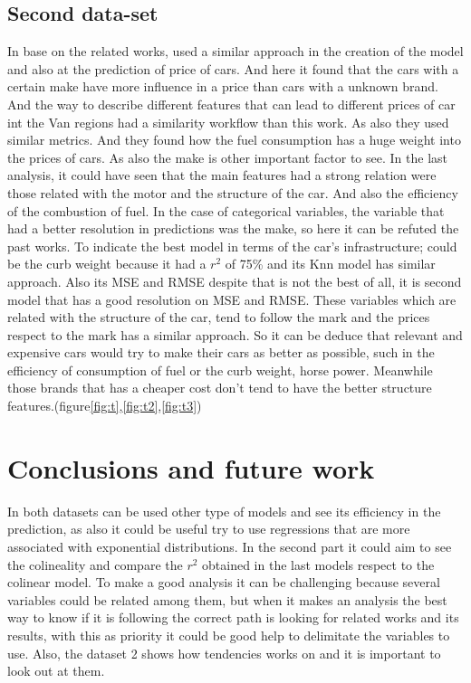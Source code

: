 \documentclass{article}
\begin{document}
\subsection{Second data-set}
In base on the related works, \citep{article_1012052} used a similar approach in the creation of the model and also at the prediction of price of cars. And here it found that the cars with a certain make have more influence in a price than cars with a unknown brand. And \citep{WOS:000927105100001} the way to describe different features that can lead to different prices of car int the Van regions had a similarity workflow than this work. As also they used similar metrics. And \citep{WEBER2019109} they found how the fuel consumption has a huge weight into the prices of cars. As also the make is other important factor to see.
In the last analysis, it could have seen that the main features had a strong relation were those related with the motor and the structure of the car. And also the efficiency of the combustion of fuel. In the case of categorical variables, the variable that had a better resolution in predictions was the make, so here it can be refuted the past works. To indicate the best model in terms of the car's infrastructure; could be the curb weight because it had a $r^2$ of 75\% and its Knn model has  similar approach. Also its MSE and RMSE despite that is not the best of all, it is second model that has a good resolution on MSE and RMSE. 
These variables which are related with the structure of the car, tend to follow the mark and the prices respect to the mark has a similar approach. So it can be deduce that relevant and expensive cars would try to make their cars as better as possible, such in the efficiency of consumption of fuel or the curb weight, horse power. Meanwhile those brands that has a cheaper cost don't tend to have the better structure features.(figure\ref{fig:t},\ref{fig:t2},\ref{fig:t3})  
\section{Conclusions and future work}
In both datasets can be used other type of models and see its efficiency in the prediction, as also it could be useful try to use regressions that are more associated with exponential distributions. In the second part it could aim to see the colineality and compare the $r^2$ obtained in the last models respect to the colinear model.
To make a good analysis it can be challenging because several variables could be related among them, but when it makes an analysis the best way to know if it is following the correct path is looking for related works and its results, with this as priority it could be good help to delimitate the variables to use. Also, the dataset 2 shows how tendencies works on and it is important to look out at them.


\end{document}
